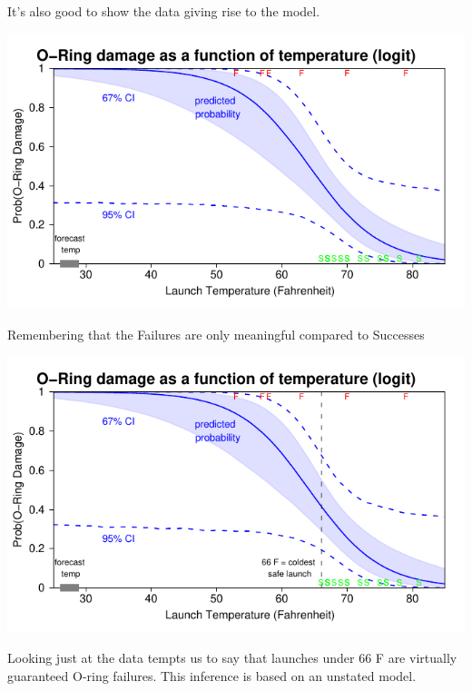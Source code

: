 \documentclass[pdflatex,landscape,titlepage]{foils}
\begin{document}
It's also good to show the data giving rise to the model.

\foilhead[-0.75in]{}


\begin{center}
\includegraphics[width=10.5 in]{chall4}
\end{center}

Remembering that the Failures are only meaningful compared to Successes

\foilhead[-0.75in]{}


\begin{center}
\includegraphics[width=10.5 in]{chall5}
\end{center}

\vspace{-2 em}

Looking just at the data tempts us to say that launches under 66 F are virtually guaranteed O-ring failures.  This inference is based on an unstated model.

\foilhead[-0.75in]{}
\end{document}
